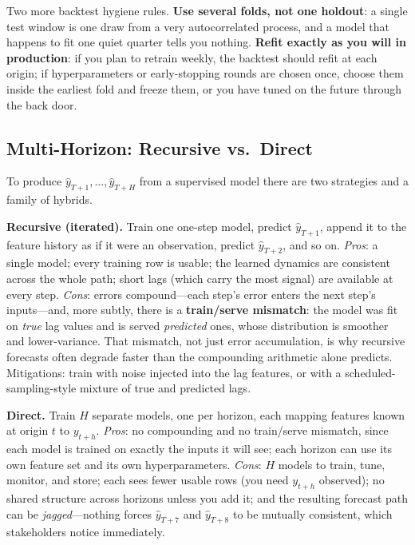 Two more backtest hygiene rules. \textbf{Use several folds, not one holdout}: a single test window is one draw from a very autocorrelated process, and a model that happens to fit one quiet quarter tells you nothing. \textbf{Refit exactly as you will in production}: if you plan to retrain weekly, the backtest should refit at each origin; if hyperparameters or early-stopping rounds are chosen once, choose them inside the earliest fold and freeze them, or you have tuned on the future through the back door.

\subsection{Multi-Horizon: Recursive vs.\ Direct}

To produce $\hat{y}_{T+1}, \ldots, \hat{y}_{T+H}$ from a supervised model there are two strategies and a family of hybrids.

\textbf{Recursive (iterated).} Train one one-step model, predict $\hat{y}_{T+1}$, append it to the feature history as if it were an observation, predict $\hat{y}_{T+2}$, and so on. \emph{Pros}: a single model; every training row is usable; the learned dynamics are consistent across the whole path; short lags (which carry the most signal) are available at every step. \emph{Cons}: errors compound---each step's error enters the next step's inputs---and, more subtly, there is a \textbf{train/serve mismatch}: the model was fit on \emph{true} lag values and is served \emph{predicted} ones, whose distribution is smoother and lower-variance. That mismatch, not just error accumulation, is why recursive forecasts often degrade faster than the compounding arithmetic alone predicts. Mitigations: train with noise injected into the lag features, or with a scheduled-sampling-style mixture of true and predicted lags.

\textbf{Direct.} Train $H$ separate models, one per horizon, each mapping features known at origin $t$ to $y_{t+h}$. \emph{Pros}: no compounding and no train/serve mismatch, since each model is trained on exactly the inputs it will see; each horizon can use its own feature set and its own hyperparameters. \emph{Cons}: $H$ models to train, tune, monitor, and store; each sees fewer usable rows (you need $y_{t+h}$ observed); no shared structure across horizons unless you add it; and the resulting forecast path can be \emph{jagged}---nothing forces $\hat{y}_{T+7}$ and $\hat{y}_{T+8}$ to be mutually consistent, which stakeholders notice immediately.

